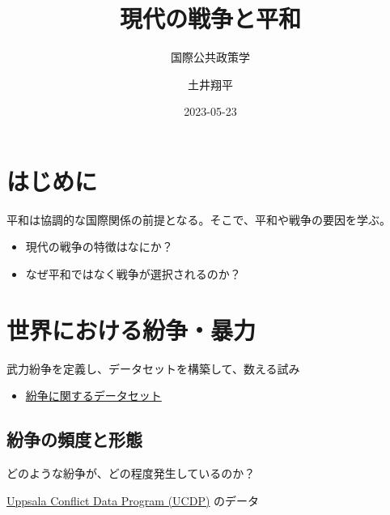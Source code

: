 \documentclass[
  xelatex,
  ja=standard]{bxjsarticle}
\title{現代の戦争と平和}
\subtitle{国際公共政策学}
\author{土井翔平}
\date{2023-05-23}
\providecommand{\tightlist}{%
  \setlength{\itemsep}{0pt}\setlength{\parskip}{0pt}}\usepackage{longtable,booktabs,array}
\begin{document}
\maketitle
\ifdefined\Shaded\renewenvironment{Shaded}{\begin{tcolorbox}[frame hidden, interior hidden, breakable, boxrule=0pt, borderline west={3pt}{0pt}{shadecolor}, enhanced, sharp corners]}{\end{tcolorbox}}\fi

\hypertarget{ux306fux3058ux3081ux306b}{%
\section*{はじめに}\label{ux306fux3058ux3081ux306b}}

平和は協調的な国際関係の前提となる。そこで、平和や戦争の要因を学ぶ。

\begin{itemize}
\tightlist
\item
  現代の戦争の特徴はなにか？
\item
  なぜ平和ではなく戦争が選択されるのか？
\end{itemize}

\hypertarget{ux4e16ux754cux306bux304aux3051ux308bux7d1bux4e89ux66b4ux529b}{%
\section{世界における紛争・暴力}\label{ux4e16ux754cux306bux304aux3051ux308bux7d1bux4e89ux66b4ux529b}}

武力紛争を定義し、データセットを構築して、数える試み\citep[序章]{tago2020}

\begin{itemize}
\tightlist
\item
  \href{https://www.cao.go.jp/pko/pko_j/organization/researcher/atpkonow/article099.html}{紛争に関するデータセット}
\end{itemize}

\hypertarget{ux7d1bux4e89ux306eux983bux5ea6ux3068ux5f62ux614b}{%
\subsection{紛争の頻度と形態}\label{ux7d1bux4e89ux306eux983bux5ea6ux3068ux5f62ux614b}}

どのような紛争が、どの程度発生しているのか？

\href{https://ucdp.uu.se/encyclopedia}{Uppsala Conflict Data Program
(UCDP)} のデータ\citep{gleditsch2002}
\end{document}
